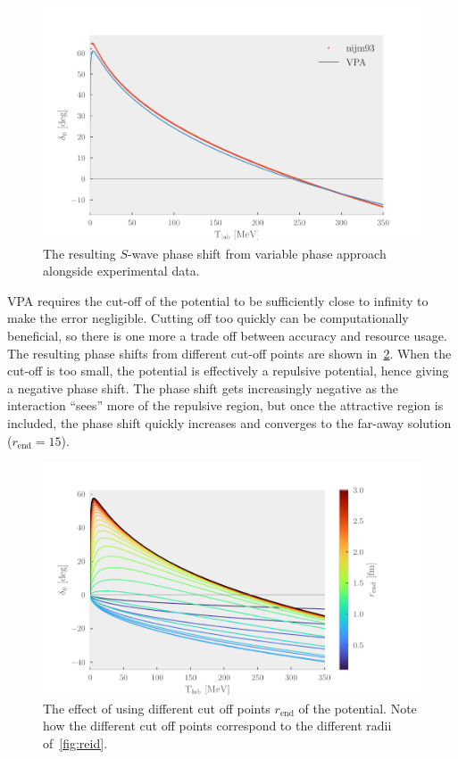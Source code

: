 \begin{figure}[ht!]
  \centering
  \includegraphics[]{Figures/vpa.pdf}
  \caption{\label{fig:vpa}The resulting \(S\)-wave phase shift from variable
    phase approach alongside experimental data.}
\end{figure}

VPA requires the cut-off of the potential to be sufficiently close to infinity
to make the error negligible. Cutting off too quickly can be computationally
beneficial, so there is one more a trade off between accuracy and resource
usage. The resulting phase shifts from different cut-off points are shown
in~\cref{fig:rend}. When the cut-off is too small, the potential is effectively
a repulsive potential, hence giving a negative phase shift. The phase shift gets
increasingly negative as the interaction ``sees'' more of the repulsive region,
but once the attractive region is included, the phase shift quickly increases
and converges to the far-away solution (\(r_{\text{end}}=15\)).


\begin{figure}[ht!]
  \centering
  \includegraphics[]{Figures/rend.pdf}
  \caption{\label{fig:rend}The effect of using different cut off points
    \(r_{\mathrm{end}}\) of the potential. Note how the different cut off points
    correspond to the different radii of~\cref{fig:reid}.}
\end{figure}


